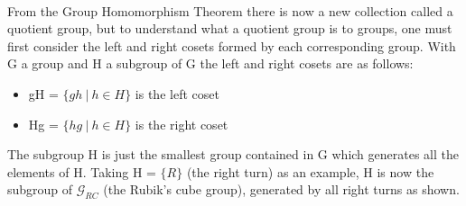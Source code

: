 \documentclass{article}
\newcounter{lem}[section]\setcounter{lem}{0}
\begin{document}
\paragraph{}From the Group Homomorphism Theorem there is now a new collection called a quotient group, but to understand what a quotient group is to groups, one must first consider the left and right cosets formed by each corresponding group.	
With G a group and H a subgroup of G the left and right cosets are as follows:
\begin{itemize}
\item gH = $\{gh\ |\ h \in H\}$ is the left coset 
\item Hg = $\{hg\ |\ h \in H\}$ is the right coset 
\end{itemize}
The subgroup H is just the smallest group contained in G which generates all the elements of H. Taking H = $\{R\}$ (the right turn) as an example, H is now the subgroup of $\mathcal{G}_{RC}$ (the Rubik's cube group), generated by all right turns as shown. 
\end{document}
